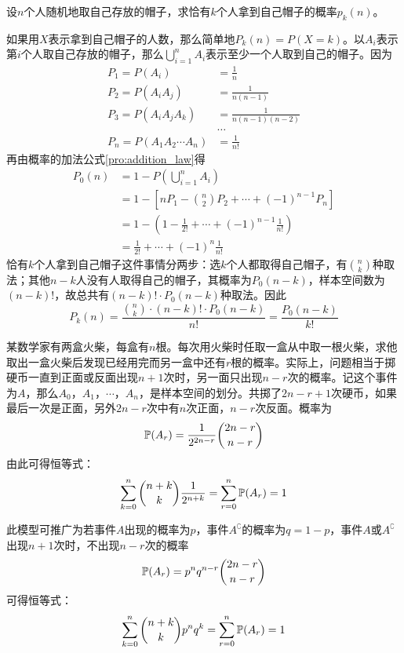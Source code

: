 \begin{example}[配对问题]\label{exam:pairing}
    设$n$个人随机地取自己存放的帽子，求恰有$k$个人拿到自己帽子的概率$p_k(n)$。
\end{example}
\begin{solution}
    如果用$X$表示拿到自己帽子的人数，那么简单地$P_k(n) = P(X = k)$。以$A_i$表示第$i$个人取自己存放的帽子，那么$\bigcup_{i=1}^n A_i$表示至少一个人取到自己的帽子。因为
    \begin{align*}
        P_1 = P(A_i)                & = \frac1{n}             \\
        P_2 = P(A_i A_j)            & = \frac1{n (n-1)}       \\
        P_3 = P(A_i A_j A_k)        & = \frac1{n (n-1) (n-2)} \\
                                    & \ldots                  \\
        P_n = P(A_1 A_2 \dotsb A_n) & = \frac1{n!}
    \end{align*}
    再由概率的加法公式\ref{pro:addition_law}得
    \begin{align*}
        P_0(n) & = 1 - P(\bigcup_{i=1}^n A_i)                             \\
               & = 1 - [n P_1 - \binom{n}{2} P_2 + \cdots+(-1)^{n-1} P_n] \\
               & = 1-(1 - \frac1{2!} + \dotsb + (-1)^{n-1} \frac1{n!})    \\
               & = \frac1{2!} + \dotsb + (-1)^n \frac1{n!}
    \end{align*}
    恰有$k$个人拿到自己帽子这件事情分两步：选$k$个人都取得自己帽子，有$\binom{n}{k}$种取法；其他$n-k$人没有人取得自己的帽子，其概率为$P_0(n-k)$，样本空间数为$(n-k)!$，故总共有$(n-k)!\cdot P_0(n-k)$种取法。因此
    \[ P_k(n)=\frac{\binom{n}{k} \cdot (n-k)!\cdot P_0(n-k)}{n!}=\frac{P_0(n-k)}{k!} \]
\end{solution}

\begin{example}[Banach]
    某数学家有两盒火柴，每盒有$n$根。每次用火柴时任取一盒从中取一根火柴，求他取出一盒火柴后发现已经用完而另一盒中还有$r$根的概率。实际上，问题相当于掷硬币一直到正面或反面出现$n+1$次时，另一面只出现$n-r$次的概率。记这个事件为$A$，那么$A_0，A_1，\cdots ，A_n$，是样本空间的划分。共掷了$2n-r+1$次硬币，如果最后一次是正面，另外$2n-r$次中有$n$次正面，$n-r$次反面。概率为
    \[ \P(A_r)=\frac1{2^{2n-r}}\binom{2n-r}{n-r} \]
    由此可得恒等式：
    \[ \sum_{k=0}^n \binom{n+k}{k} \frac1{2^{n+k}} = \sum_{r=0}^n \P(A_r) = 1 \]

    此模型可推广为若事件$A$出现的概率为$p$，事件$A^{\complement}$的概率为$q=1-p$，事件$A$或$A^{\complement}$出现$n+1$次时，不出现$n-r$次的概率
    \[ \P(A_r)=p^n q^{n-r} \binom{2n-r}{n-r} \]
    可得恒等式：
    \[\sum_{k=0}^n \binom{n+k}{k} p^{n} q^{k} = \sum_{r=0}^n \P(A_r) = 1 \]
\end{example}

